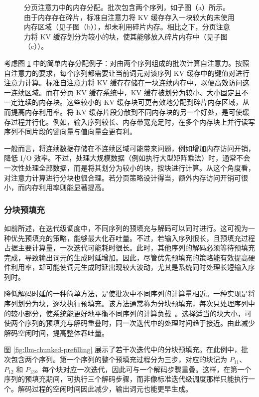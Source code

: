 \begin{figure}[!t]
\centering

\vspace{-0.5cm} \caption{分页注意力中的内存分配。批次包含两个序列，如子图（a）所示。由于内存存在碎片，标准自注意力将 KV 缓存存入一块较大的未使用内存区域（见子图（b）），却未利用碎片内存。相比之下，分页注意力将 KV 缓存划分为较小的块，使其能够放入碎片内存中（见子图（c））。}
\label{fig:llm-paged-attention-example}
\end{figure}

考虑图 \ref{fig:llm-paged-attention-example} 中的简单内存分配例子：对由两个序列组成的批次计算自注意力。按照自注意力的要求，每个序列都需要让当前词元对该序列 KV 缓存中的键值对进行注意力计算。标准自注意力将 KV 缓存存储在一块连续内存中，以便高效访问这一连续区域。而在分页 KV 缓存系统中，KV 缓存被划分为较小、大小固定且不一定连续的内存块。这些较小的 KV 缓存块可更有效地分配到碎片内存区域，从而提高内存利用率。将 KV 缓存片段分散到不同内存块的另一个好处，是可使缓存过程并行化。例如，输入序列较长、内存带宽充足时，在多个内存块上并行读写序列不同片段的键向量与值向量会更有利。

一般而言，将连续数据存储在不连续区域可能带来问题，例如增加内存访问开销，降低 I/O 效率。不过，处理大规模数据（例如执行大型矩阵乘法）时，通常不会一次性处理全部数据，而是将其划分为较小的块，按块进行计算。从这个角度看，对注意力计算进行分块也很合理。若分页策略设计得当，额外内存访问开销可很小，而内存利用率则能显著提高。

\subsubsection{分块预填充}

如前所述，在迭代级调度中，不同序列的预填充与解码可以同时进行。这可视为一种优先预填充的策略，能够最大化吞吐量。不过，若输入序列很长，且预填充过程占据主要计算量，一次迭代可能耗时很长。此时，其他序列的解码必须等待预填充完成，导致输出词元的生成时延增加。因此，尽管优先预填充的策略能有效提高硬件利用率，却可能使词元生成时延出现较大波动，尤其是系统同时处理长短输入序列时。

降低解码时延的一种简单方法，是使批次中不同序列的计算量相近。一种实现是将序列划分为块，逐块执行预填充。该方法通常称为分块预填充，每次只处理序列中的较小部分，使系统能更好地平衡不同序列的计算负载~\cite{agrawal-etal:2023sarathi}。选择适当的块大小，可使两个序列的预填充与解码重叠时，同一次迭代中的处理时间趋于接近。由此减少解码空闲时间，提高整体吞吐量。

图 \ref{fig:llm-chunked-prefilling} 展示了若干次迭代中的分块预填充。在此例中，批次包含两个序列。第一个序列的整个预填充过程分为三步，对应的块记为 $P_{11}$、$P_{12}$ 和 $P_{13}$。每个块对应一次迭代，因此可与一个解码步骤重叠。这样，在第一个序列的预填充期间，可执行三个解码步骤，而非像标准迭代级调度那样只能执行一个。解码过程的空闲时间因此减少，输出词元也能更早生成。

